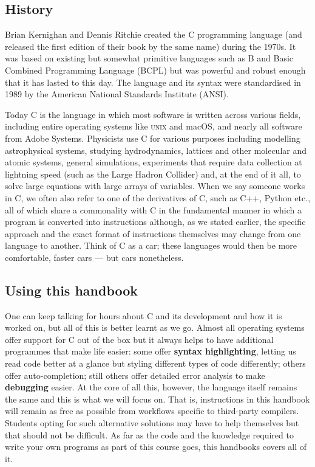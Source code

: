 \documentclass[11pt,oneside]{article}
\begin{document}
\subsection{History}

Brian Kernighan and Dennis Ritchie created the C programming language (and released the first edition of their book by the same name) during the 1970s. It was based on existing but somewhat primitive languages such as B and Basic Combined Programming Language (BCPL) but was powerful and robust enough that it has lasted to this day. The language and its syntax were standardised in 1989 by the American National Standards Institute (ANSI).

Today C is the language in which most software is written across various fields, including entire operating systems like \textsc{unix} and macOS, and nearly all software from Adobe Systems. Physicists use C for various purposes including modelling astrophysical systems, studying hydrodynamics, lattices and other molecular and atomic systems, general simulations, experiments that require data collection at lightning speed (such as the Large Hadron Collider) and, at the end of it all, to solve large equations with large arrays of variables. When we say someone works in C, we often also refer to one of the derivatives of C, such as C++, Python etc., all of which share a commonality with C in the fundamental manner in which a program is converted into instructions although, as we stated earlier, the specific approach and the exact format of instructions themselves may change from one language to another. Think of C as a car; these languages would then be more comfortable, faster cars --- but cars nonetheless.

\subsection{Using this handbook}

One can keep talking for hours about C and its development and how it is worked on, but all of this is better learnt as we go. Almost all operating systems offer support for C out of the box but it always helps to have additional programmes that make life easier: some offer \textbf{syntax highlighting}, letting us read code better at a glance but styling different types of code differently; others offer auto-completion; still others offer detailed error analysis to make \textbf{debugging} easier. At the core of all this, however, the language itself remains the same and this is what we will focus on. That is, instructions in this handbook will remain as free as possible from workflows specific to third-party compilers. Students opting for such alternative solutions may have to help themselves but that should not be difficult. As far as the code and the knowledge required to write your own programs as part of this course goes, this handbooks covers all of it.
\end{document}
